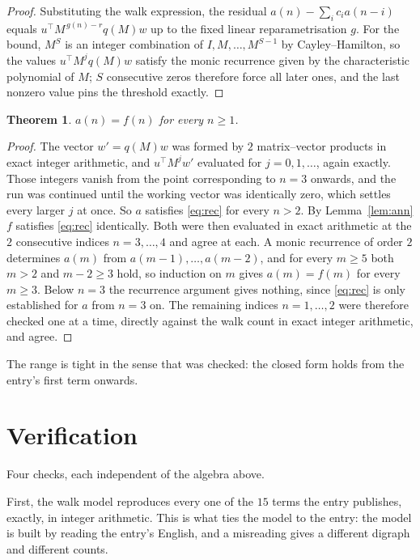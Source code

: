 \documentclass[11pt,a4paper]{article}
\theoremstyle{plain}
\newtheorem{theorem}{Theorem}
\theoremstyle{definition}
\begin{document}
\begin{proof}
Substituting the walk expression, the residual $a(n)-\sum_ic_ia(n-i)$ equals
$u^{\!\top}M^{\,g(n)-r}q(M)w$ up to the fixed linear reparametrisation $g$. For the bound,
$M^{S}$ is an integer combination of $I,M,\dots,M^{S-1}$ by Cayley--Hamilton, so the values
$u^{\!\top}M^{j}q(M)w$ satisfy the monic recurrence given by the characteristic polynomial of
$M$; $S$ consecutive zeros therefore force all later ones, and the last nonzero value pins the
threshold exactly.
\end{proof}

\begin{theorem}
$a(n)=f(n)$ for every $n\ge1$.
\end{theorem}

\begin{proof}
The vector $w'=q(M)w$ was formed by $2$ matrix--vector products in exact integer
arithmetic, and $u^{\!\top}M^{j}w'$ evaluated for $j=0,1,\dots$, again exactly. Those integers
vanish from the point corresponding to $n=3$ onwards, and the run was continued until the
working vector was identically zero, which settles every larger $j$ at once. So $a$ satisfies
\eqref{eq:rec} for every $n>2$. By Lemma~\ref{lem:ann} $f$ satisfies \eqref{eq:rec}
identically. Both were then evaluated in exact arithmetic at the $2$ consecutive indices
$n=3,\dots,4$ and agree at each. A monic recurrence of order $2$
determines $a(m)$ from $a(m-1),\dots,a(m-2)$, and for every $m\ge5$ both
$m>2$ and $m-2\ge3$ hold, so induction on $m$ gives $a(m)=f(m)$ for every
$m\ge3$.
Below $n=3$ the recurrence argument gives nothing, since \eqref{eq:rec} is only
established for $a$ from $n=3$ on. The remaining indices $n=1,\dots,2$ were
therefore checked one at a time, directly against the walk count in exact integer arithmetic,
and agree.
\end{proof}

The range is tight in the sense that was checked: the closed form holds from the entry's first term onwards.

\section{Verification}

Four checks, each independent of the algebra above.

First, the walk model reproduces every one of the $15$ terms the entry publishes,
exactly, in integer arithmetic. This is what ties the model to the entry: the model is built
by reading the entry's English, and a misreading gives a different digraph and different
counts.
\end{document}
